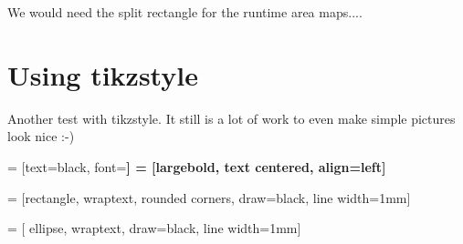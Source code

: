 We would need the split rectangle for the runtime area maps....


\section{Using tikzstyle}

Another test with tikzstyle. It still is a lot of work to even make simple pictures look nice :-)


 = [text=black, font=\bfseries\large]
 = [largebold, text centered, align=left]

 = [rectangle,
                                wraptext,
                                rounded corners,
                                draw=black,
                                line width=1mm]

 = [   ellipse,
                            wraptext,
                            draw=black,
                            line width=1mm]

